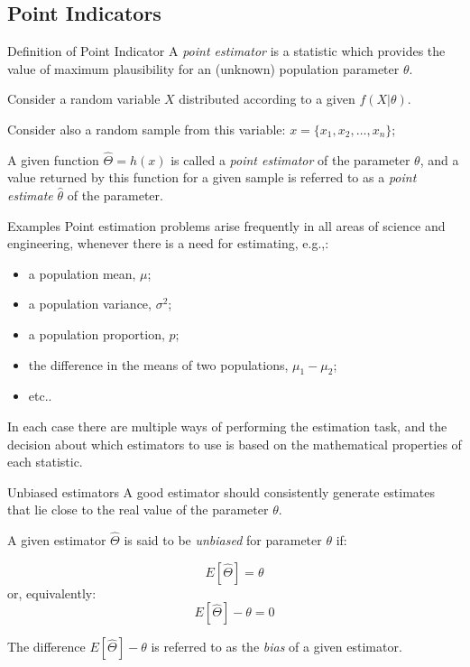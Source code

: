 \subsection{Point Indicators}
\begin{frame}{Definition of Point Indicator}
  A \emph{point estimator} is a statistic which provides the value of maximum plausibility for an (unknown) population parameter $\theta$.
  \bigskip

  Consider a random variable $X$ distributed according to a given $f(X|\theta)$.\bigskip

  Consider also a random sample from this variable: $x=\{x_1,x_2,\ldots,x_n\}$;\bigskip

  A given function $\hat{\Theta}=h\left(x\right)$ is called a \emph{point estimator} of the parameter $\theta$, and a value returned by this function for a given sample is referred to as a \emph{point estimate} $\hat{\theta}$ of the parameter.
\end{frame}

\begin{frame}{Examples}
Point estimation problems arise frequently in all areas of science and engineering, whenever there is a need for estimating, e.g.,:\bigskip

\begin{itemize}
  \item a population  mean, $\mu$;
	\item a population variance, $\sigma^2$;
	\item a population proportion, $p$;
	\item the difference in the means of two populations, $\mu_1-\mu_2$;
	\item etc..
\end{itemize}\bigskip

In each case there are multiple ways of performing the estimation task, and the decision about which estimators to use is based on the mathematical properties of each statistic.
\end{frame}


\begin{frame}{Unbiased estimators}
A good estimator should consistently generate estimates that lie close to the real value of the parameter $\theta$.\bigskip

A given estimator $\hat{\Theta}$ is said to be \textit{unbiased} for parameter $\theta$ if:\bigskip

\begin{equation*}
E\left[\hat{\Theta}\right] = \theta
\end{equation*}
\noindent or, equivalently:
\begin{equation*}
E\left[\hat{\Theta}\right] - \theta = 0
\end{equation*}\bigskip

The difference $E\left[\hat{\Theta}\right] - \theta$ is referred to as the \textit{bias} of a given estimator.
\end{frame}

